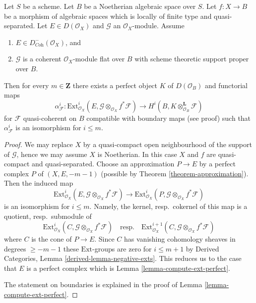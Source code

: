 \begin{lemma}
\label{lemma-compute-ext}
Let $S$ be a scheme. Let $B$ be a Noetherian algebraic space over $S$.
Let $f : X \to B$ be a morphism of algebraic spaces which is locally of
finite type and quasi-separated. Let $E \in D(\mathcal{O}_X)$
and $\mathcal{G}$ an $\mathcal{O}_X$-module. Assume
\begin{enumerate}
\item $E \in D^-_{\textit{Coh}}(\mathcal{O}_X)$, and
\item $\mathcal{G}$ is a coherent $\mathcal{O}_X$-module flat over $B$
with scheme theoretic support proper over $B$.
\end{enumerate}
Then for every $m \in \mathbf{Z}$ there exists a perfect object $K$
of $D(\mathcal{O}_B)$ and functorial maps
$$
\alpha^i_\mathcal{F} :
\text{Ext}^i_{\mathcal{O}_X}(E,
\mathcal{G} \otimes_{\mathcal{O}_X} f^*\mathcal{F})
\longrightarrow
H^i(B, K \otimes^\mathbf{L}_{\mathcal{O}_B} \mathcal{F})
$$
for $\mathcal{F}$ quasi-coherent on $B$
compatible with boundary maps (see proof)
such that $\alpha^i_\mathcal{F}$ is an isomorphism for $i \leq m$.
\end{lemma}

\begin{proof}
We may replace $X$ by a quasi-compact open neighbourhood of
the support of $\mathcal{G}$, hence we may assume $X$ is Noetherian.
In this case $X$ and $f$ are quasi-compact and quasi-separated.
Choose an approximation $P \to E$ by a perfect complex $P$ of $(X, E, -m - 1)$
(possible by Theorem \ref{theorem-approximation}).
Then the induced map
$$
\text{Ext}^i_{\mathcal{O}_X}(E,
\mathcal{G} \otimes_{\mathcal{O}_X} f^*\mathcal{F})
\longrightarrow
\text{Ext}^i_{\mathcal{O}_X}(P,
\mathcal{G} \otimes_{\mathcal{O}_X} f^*\mathcal{F})
$$
is an isomorphism for $i \leq m$. Namely, the kernel, resp.\ cokernel of this
map is a quotient, resp.\ submodule of
$$
\text{Ext}^i_{\mathcal{O}_X}(C,
\mathcal{G} \otimes_{\mathcal{O}_X} f^*\mathcal{F})
\quad\text{resp.}\quad
\text{Ext}^{i + 1}_{\mathcal{O}_X}(C,
\mathcal{G} \otimes_{\mathcal{O}_X} f^*\mathcal{F})
$$
where $C$ is the cone of $P \to E$. Since $C$ has vanishing cohomology
sheaves in degrees $\geq -m - 1$ these $\text{Ext}$-groups are zero
for $i \leq m + 1$ by
Derived Categories, Lemma \ref{derived-lemma-negative-exts}.
This reduces us to the case that
$E$ is a perfect complex which is Lemma \ref{lemma-compute-ext-perfect}.

\medskip\noindent
The statement on boundaries is explained in the proof of
Lemma \ref{lemma-compute-ext-perfect}.
\end{proof}








